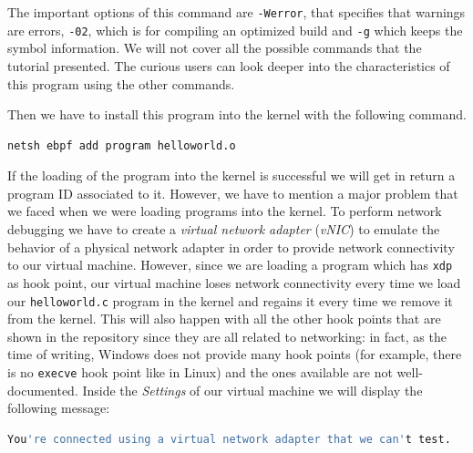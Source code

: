 The important options of this command are \colorbox{backcolour}{\lstinline[style=commandline, language=bash, breaklines=true]|-Werror|}, that specifies that warnings are errors, \colorbox{backcolour}{\lstinline[style=commandline, language=bash, breaklines=true]|-02|}, which is for compiling an optimized build and \colorbox{backcolour}{\lstinline[style=commandline, language=bash, breaklines=true]|-g|} which keeps the symbol information.
We will not cover all the possible commands that the tutorial presented.
The curious users can look deeper into the characteristics of this program using the other commands.

Then we have to install this program into the kernel with the following command.

\begin{lstlisting}[style=commandline, language=bash, caption={``Hello world!''-like program installation command in ebpf-for-windows.}]
	netsh ebpf add program helloworld.o
\end{lstlisting}

If the loading of the program into the kernel is successful we will get in return a program ID associated to it.
However, we have to mention a major problem that we faced when we were loading programs into the kernel.
To perform network debugging we have to create a \textit{virtual network adapter} (\textit{vNIC}) to emulate the behavior of a physical network adapter in order to provide network connectivity to our virtual machine.
However, since we are loading a program which has \colorbox{backcolour}{\lstinline[style=commandline, language=bash, breaklines=true]|xdp|} as hook point, our virtual machine loses network connectivity every time we load our \colorbox{backcolour}{\lstinline[style=commandline, language=bash, breaklines=true]|helloworld.c|} program in the kernel and regains it every time we remove it from the kernel.
This will also happen with all the other hook points that are shown in the repository since they are all related to networking: in fact, as the time of writing, Windows does not provide many hook points (for example, there is no \colorbox{backcolour}{\lstinline[style=commandline, language=bash, breaklines=true]|execve|} hook point like in Linux) and the ones available are not well-documented.
Inside the \textit{Settings} of our virtual machine we will display the following message:

\begin{lstlisting}[style=commandline, language=bash, caption={Network adapter problem message on the virtual machine.}]
	You're connected using a virtual network adapter that we can't test.
\end{lstlisting}

